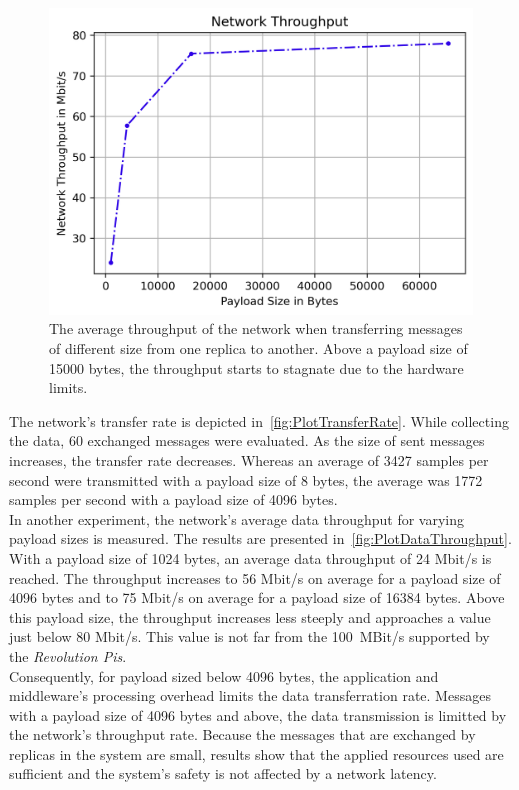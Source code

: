 \begin{figure}[!hb]
	\centering
	\includegraphics[width=0.8\linewidth]{images/plots/dataThroughput}
	\caption{The average throughput of the network when transferring messages of different size from one replica to another. Above a payload size of 15000 bytes, the throughput starts to stagnate due to the  hardware limits.}
	\label{fig:PlotDataThroughput}
\end{figure}

The network's transfer rate is depicted in~\autoref{fig:PlotTransferRate}.
While collecting the data, 60 exchanged messages were evaluated.
As the size of sent messages increases, the transfer rate decreases.
Whereas an average of 3427 samples per second were transmitted with a payload size of 8 bytes, the average was 1772 samples per second with a payload size of 4096 bytes.
\\

In another experiment, the network's average data throughput for varying payload sizes is measured.
The results are presented in~\autoref{fig:PlotDataThroughput}.
With a payload size of 1024 bytes, an average data throughput of 24 Mbit/s is reached.
The throughput increases to 56 Mbit/s on average for a payload size of 4096 bytes and to 75 Mbit/s on average for a payload size of 16384 bytes.
Above this payload size, the throughput increases less steeply and approaches a value just below 80 Mbit/s.
This value is not far from the 100~MBit/s supported by the \textit{Revolution Pis}.
\\

Consequently, for payload sized below 4096 bytes, the application and middleware's processing overhead limits the data transferration rate.
Messages with a payload size of 4096 bytes and above, the data transmission is limitted by the network's throughput rate.
Because the messages that are exchanged by replicas in the system are small, results show that the applied resources used are sufficient and the system's safety is not affected by a network latency.


